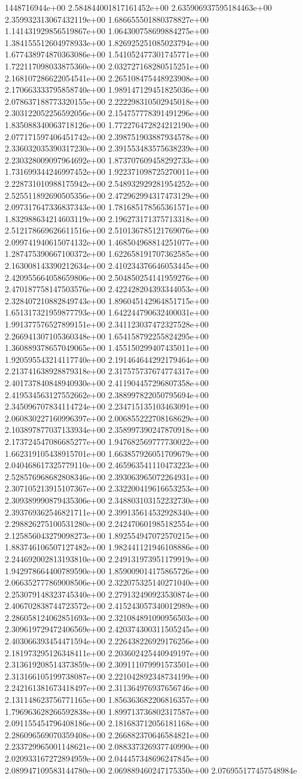 1448716944e+00	2.584844001817161452e+00	2.635906937595184463e+00	2.359932313067432119e+00	1.686655501880378827e+00	1.141431929856519867e+00	1.064300758699884275e+00	1.384155512604978933e+00	1.826925251085023794e+00	1.677438974870363086e+00	1.541052477301745771e+00	1.722117098033875360e+00	2.032727168280515251e+00	2.168107286622054541e+00	2.265108475448923908e+00	2.170663333795858740e+00	1.989147129451825036e+00	2.078637188773320155e+00	2.222298310502945018e+00	2.303122052256592056e+00	2.154757778391491296e+00	1.835088340063718126e+00	1.772276472824212190e+00	2.077171597406451742e+00	2.398751903887934578e+00	2.336032035390317230e+00	2.391553483575638239e+00	2.230328009097964692e+00	1.873707609458292733e+00	1.731699344246997452e+00	1.922371098725270011e+00	2.228731010988175942e+00	2.548932929281954252e+00	2.525511892690505356e+00	2.472962994317473129e+00	2.097317647336837343e+00	1.781685178565361571e+00	1.832988634214603119e+00	2.196273171375713318e+00	2.512178669626611516e+00	2.510136785121769076e+00	2.099741940615074132e+00	1.468504968814251077e+00	1.287475390667100372e+00	1.622658191707362585e+00	2.163008143390212634e+00	2.410234376646053445e+00	2.420955664058659806e+00	2.504850254141959276e+00	2.470187758147503576e+00	2.422428204393344053e+00	2.328407210882849743e+00	1.896045142964851715e+00	1.651317321959877793e+00	1.642244790632400031e+00	1.991377576527899151e+00	2.341123037472327528e+00	2.266941307105360348e+00	1.654158792255824295e+00	1.360889378657049065e+00	1.455150299407435011e+00	1.920595543214117740e+00	2.191464644292179464e+00	2.213741638928879318e+00	2.317575737674774317e+00	2.401737840848940930e+00	2.411904457296807358e+00	2.419534563127552662e+00	2.388997822050795694e+00	2.345096707834114724e+00	2.234715135103463091e+00	2.060830227160996397e+00	2.006855222708168629e+00	2.103897877037133934e+00	2.358997390247870918e+00	2.173724547086685277e+00	1.947682569777730022e+00	1.662319105438915701e+00	1.663857926051709679e+00	2.040468617325779110e+00	2.465963541110473223e+00	2.528576968682808346e+00	2.393063965072264931e+00	2.307105213915107367e+00	2.332200419616653253e+00	2.309389990879435306e+00	2.348803103152232730e+00	2.393769362546821711e+00	2.399135614532928340e+00	2.298826275100531280e+00	2.242470601985182554e+00	2.125856043279098273e+00	1.892554947072570215e+00	1.883746106507127482e+00	1.982441121946108886e+00	2.244692002813193810e+00	2.249131973951179919e+00	1.942978664400789590e+00	1.859009014175865726e+00	2.066352777869008506e+00	2.322075325140271040e+00	2.253079148323745340e+00	2.279132490923530874e+00	2.406702838744723572e+00	2.415243057340012989e+00	2.286058124062851693e+00	2.321084891090956503e+00	2.309619729472406569e+00	2.420374300311505245e+00	2.403066393454471594e+00	2.226438226929176256e+00	2.181973295126348411e+00	2.203602425440949197e+00	2.313619208514373859e+00	2.309111079991573501e+00	2.313166105199738087e+00	2.221042892348734199e+00	2.242161381673418497e+00	2.311364976937656746e+00	2.131148623756771165e+00	1.856363682206816357e+00	1.796963628266592838e+00	1.899713736802317587e+00	2.091155454796408186e+00	2.181683712056181168e+00	2.286096569070359408e+00	2.266882370646584821e+00	2.233729965001148621e+00	2.088337326937740990e+00	2.020933167272894959e+00	2.044457348696247845e+00	2.089947109583144780e+00	2.069889460247175350e+00	2.076955177457548984e
